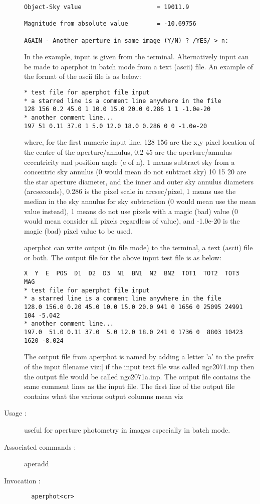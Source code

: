 \begin{description}
\begin{verbatim}
Object-Sky value                     = 19011.9
 
Magnitude from absolute value        = -10.69756
 
AGAIN - Another aperture in same image (Y/N) ? /YES/ > n:
\end{verbatim}

In the example, input is given from the terminal.  Alternatively input
can be made to aperphot in batch mode from a text (ascii) file.  An
example of the format of the ascii file is as below:

\begin{verbatim}
* test file for aperphot file input
* a starred line is a comment line anywhere in the file
128 156 0.2 45.0 1 10.0 15.0 20.0 0.286 1 1 -1.0e-20
* another comment line...
197 51 0.11 37.0 1 5.0 12.0 18.0 0.286 0 0 -1.0e-20
\end{verbatim}

where, for the first numeric input line, 128 156 are the x,y pixel
location of the centre of the aperture/annulus, 0.2 45 are the
aperture/annulus eccentricity and position angle (e of n), 1 means
subtract sky from a concentric sky annulus (0 would mean do not subtract
sky) 10 15 20 are the star aperture diameter, and the inner and outer sky
annulus diameters (arcseconds), 0.286 is the pixel scale in arcsec/pixel,
1 means use the median in the sky annulus for sky subtraction (0 would
mean use the mean value instead), 1 means do not use pixels with a magic
(bad) value (0 would mean consider all pixels regardless of value), and
-1.0e-20 is the magic (bad) pixel value to be used.

aperphot can write output (in file mode) to the terminal, a text (ascii)
file or both.  The output file for the above input test file is as below:
\begin{verbatim}
X  Y  E  POS  D1  D2  D3  N1  BN1  N2  BN2  TOT1  TOT2  TOT3  MAG
* test file for aperphot file input
* a starred line is a comment line anywhere in the file
128.0 156.0 0.20 45.0 10.0 15.0 20.0 941 0 1656 0 25095 24991  104 -5.042
* another comment line...
197.0  51.0 0.11 37.0  5.0 12.0 18.0 241 0 1736 0  8803 10423 1620 -8.024
\end{verbatim}
The output file from aperphot is named by adding a letter 'a' to the
prefix of the input filename viz:] if the input text file was called
ngc2071.inp then the output file would be called ngc2071a.inp.  The
output file contains the same comment lines as the input file.  The first
line of the output file contains what the various output columns mean
viz

\item[Usage :] useful for aperture photometry in images especially in batch
mode.
\item[Associated commands :] aperadd
\item[Invocation :]

\verb+  aperphot<cr> +\end{description}

